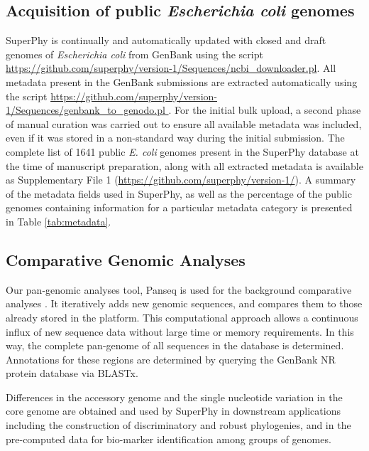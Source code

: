 \documentclass[doublespacing, linenumbers]{bmcart}
\begin{document}
\subsection{Acquisition of public \textit{Escherichia coli} genomes}
SuperPhy is continually and automatically updated with closed and draft genomes of \textit{Escherichia coli} from GenBank using the script \url{https://github.com/superphy/version-1/Sequences/ncbi_downloader.pl}. All metadata present in the GenBank submissions are extracted automatically using the script \url{https://github.com/superphy/version-1/Sequences/genbank_to_genodo.pl }. For the initial bulk upload, a second phase of manual curation was carried out to ensure all available metadata was included, even if it was stored in a non-standard way during the initial submission. The complete list of 1641 public \textit{E. coli} genomes present in the SuperPhy database at the time of manuscript preparation, along with all extracted metadata is available as Supplementary File 1 (\url{https://github.com/superphy/version-1/}). A summary of the metadata fields used in SuperPhy, as well as the percentage of the public genomes containing information for a particular metadata category is presented in Table \ref{tab:metadata}. 

\subsection{Comparative Genomic Analyses}
Our pan-genomic analyses tool, Panseq is used for the background comparative analyses \cite{laing_pan-genome_2010}. It iteratively adds new genomic sequences, and compares them to those already stored in the platform. This computational approach allows a continuous influx of new sequence data without large time or memory requirements. In this way, the complete pan-genome of all sequences in the database is determined. Annotations for these regions are determined by querying the GenBank NR protein database via BLASTx.

Differences in the accessory genome and the single nucleotide variation in the core genome are obtained and used by SuperPhy in downstream applications including the construction of discriminatory and robust phylogenies, and in the pre-computed data for bio-marker identification among groups of genomes.
\end{document}
